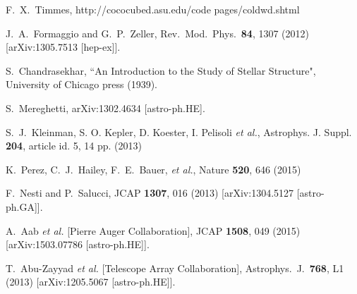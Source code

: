 \documentclass[preprintnumbers,amsmath,amssymb,prd, superscriptaddress,twocolumn]{revtex4}
\begin{document}
\begin{thebibliography}{99}
F.~X.~Timmes, http://cococubed.asu.edu/code pages/coldwd.shtml

  J.~A.~Formaggio and G.~P.~Zeller,
  Rev.\ Mod.\ Phys.\  {\bf 84}, 1307 (2012)
  [arXiv:1305.7513 [hep-ex]].


S.~Chandrasekhar, ``An Introduction to the Study of Stellar Structure", University of Chicago press (1939).

  S.~Mereghetti,
  arXiv:1302.4634 [astro-ph.HE].


S.~J.~Kleinman, S. O. Kepler, D. Koester, I. Pelisoli  {\it et al.}, Astrophys. J. Suppl. {\bf 204}, article
id. 5, 14 pp. (2013)

K.~Perez, C.~J.~Hailey, F.~E.~Bauer, {\it et al.}, Nature {\bf 520}, 646 (2015)

  F.~Nesti and P.~Salucci,
  JCAP {\bf 1307}, 016 (2013)
  [arXiv:1304.5127 [astro-ph.GA]].


  A.~Aab {\it et al.} [Pierre Auger Collaboration],
  JCAP {\bf 1508}, 049 (2015)
  [arXiv:1503.07786 [astro-ph.HE]].


  T.~Abu-Zayyad {\it et al.} [Telescope Array Collaboration],
  Astrophys.\ J.\  {\bf 768}, L1 (2013)
  [arXiv:1205.5067 [astro-ph.HE]].



\end{thebibliography}
\end{document}
